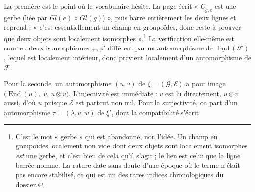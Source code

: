 \documentclass[11pt,a4paper]{article}
\begin{document}
La première est le point où le vocabulaire hésite. La page écrit
« $\underline{C}_{g,e}$ est une gerbe (liée par $Gl(e) \times Gl(g)$) », puis
barre entièrement les deux lignes et reprend : « c'est essentiellement un champ
en groupoïdes, donc reste à prouver que deux objets sont localement
isomorphes ».\footnote{C'est le mot « gerbe » qui est abandonné, non l'idée. Un
champ en groupoïdes localement non vide dont deux objets sont localement
isomorphes \emph{est} une gerbe, et c'est bien de cela qu'il s'agit ; le lien
est celui que la ligne barrée nomme. La rature date sans doute d'une époque où
le terme n'était pas encore stabilisé, ce qui est un des rares indices
chronologiques du dossier.} La vérification elle-même est courte : deux
isomorphismes $\varphi, \varphi'$ diffèrent par un automorphisme de
$\underline{\operatorname{End}}(\mathcal{F})$, lequel est localement intérieur,
donc provient localement d'un automorphisme de $\mathcal{F}$.

Pour la seconde, un automorphisme $(u,v)$ de $\xi = (\mathcal{G}, \mathcal{E})$
a pour image $\bigl(\underline{\operatorname{End}}(u),\ v,\ u \otimes v\bigr)$.
L'injectivité est immédiate : $v$ est lu directement, $u \otimes v$ aussi,
d'où $u$ puisque $\mathcal{E}$ est partout non nul. Pour la surjectivité, on
part d'un automorphisme $\tau = (\lambda, v, w)$ de $\xi'$, dont la
compatibilité s'écrit

\end{document}
